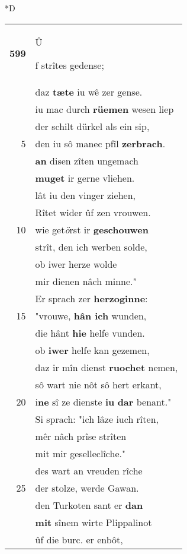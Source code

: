 \documentclass[8pt,a4paper,notitlepage]{article}
\begin{document}
\begin{table}[ht]
\begin{minipage}[t]{0.5\linewidth}
\small
\begin{center}*D
\end{center}
\begin{tabular}{rl}
\textbf{599} & \begin{large}Û\end{large}f strîtes gedense;\\ 
 & daz \textbf{tæte} iu wê zer gense.\\ 
 & iu mac durch \textbf{rüemen} wesen liep\\ 
 & der schilt dürkel als ein sip,\\ 
5 & den iu sô manec pfîl \textbf{zerbrach}.\\ 
 & \textbf{an} disen zîten ungemach\\ 
 & \textbf{muget} ir gerne vliehen.\\ 
 & lât iu den vinger ziehen,\\ 
 & Rîtet wider ûf zen vrouwen.\\ 
10 & wie get\textit{ö}rst ir \textbf{geschouwen}\\ 
 & strît, den ich werben solde,\\ 
 & ob iwer herze wolde\\ 
 & mir dienen nâch minne."\\ 
 & Er sprach zer \textbf{herzoginne}:\\ 
15 & "vrouwe, \textbf{hân ich} wunden,\\ 
 & die hânt \textbf{hie} helfe vunden.\\ 
 & ob \textbf{iwer} helfe kan gezemen,\\ 
 & daz ir mîn dienst \textbf{ruochet} nemen,\\ 
 & sô wart nie nôt sô hert erkant,\\ 
20 & i\textbf{ne} sî ze dienste \textbf{iu} \textbf{dar} benant."\\ 
 & Si sprach: "ich lâze iuch rîten,\\ 
 & mêr nâch prîse strîten\\ 
 & mit mir geselleclîche."\\ 
 & des wart an vreuden rîche\\ 
25 & der stolze, werde Gawan.\\ 
 & den Turkoten sant er \textbf{dan}\\ 
 & \textbf{mit} sînem wirte Plippalinot\\ 
 & ûf die burc. er enbôt,\\ 

\end{tabular}
\end{minipage}
\end{table}
\end{document}
